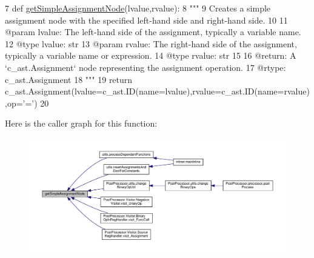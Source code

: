\begin{DoxyCode}
7 \textcolor{keyword}{def }\hyperlink{namespacePostProcessor_1_1astNodes_a1fc39a0ad420aefababe0a8ee2907f4e}{getSimpleAssignmentNode}(lvalue,rvalue):
8     \textcolor{stringliteral}{"""
}
9 \textcolor{stringliteral}{    Creates a simple assignment node with the specified left-hand side and right-hand side.
}
10 \textcolor{stringliteral}{
}
11 \textcolor{stringliteral}{    @param lvalue: The left-hand side of the assignment, typically a variable name.
}
12 \textcolor{stringliteral}{    @type lvalue: str
}
13 \textcolor{stringliteral}{    @param rvalue: The right-hand side of the assignment, typically a variable name or expression.
}
14 \textcolor{stringliteral}{    @type rvalue: str
}
15 \textcolor{stringliteral}{
}
16 \textcolor{stringliteral}{    @return: A `c\_ast.Assignment` node representing the assignment operation.
}
17 \textcolor{stringliteral}{    @rtype: c\_ast.Assignment
}
18 \textcolor{stringliteral}{    """}
19     \textcolor{keywordflow}{return} c\_ast.Assignment(lvalue=c\_ast.ID(name=lvalue),rvalue=c\_ast.ID(name=rvalue),op=\textcolor{stringliteral}{'='})
20 
\end{DoxyCode}
Here is the caller graph for this function\+:\nopagebreak
\begin{figure}[H]
\begin{center}
\leavevmode
\includegraphics[width=350pt]{namespaceastNodes_a2403f5d006e54f20e614226280cb6cbc_icgraph}
\end{center}
\end{figure}
